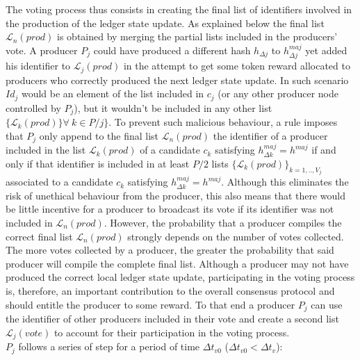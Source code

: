 The voting process thus consists in creating the final list of identifiers involved in the production of the ledger state update. As explained below the final list $\mathcal{L}_n(prod)$ is obtained by merging the partial lists included in the producers' vote. A producer $P_j$ could have produced a different hash $h_{\Delta j}$ to $h^{maj}_{\Delta j}$ yet added his identifier to $\mathcal{L}_j(prod)$ in the attempt to get some token reward allocated to producers who correctly produced the next ledger state update. In such scenario $Id_j$ would be an element of the list included in $c_j$ (or any other producer node controlled by $P_j$), but it wouldn't be included in any other list $\{\mathcal{L}_k(prod)\} \forall~k \in P/j\}$. To prevent such malicious behaviour, a rule imposes that $P_j$ only append to the final list $\mathcal{L}_n(prod)$ the identifier of a producer included in the list $\mathcal{L}_k(prod)$ of a candidate $c_k$ satisfying $h^{maj}_{\Delta k} = h^{maj}$ if and only if that identifier is included in at least $P/2$ lists $\{\mathcal{L}_{k}(prod)\}_{k=1,..,V_j}$ associated to a candidate $c_{k}$ satisfying $h^{maj}_{\Delta k} = h^{maj}$. Although this eliminates the risk of unethical behaviour from the producer, this also means that there would be little incentive for a producer to broadcast its vote if its identifier was not included in $\mathcal{L}_n(prod)$. However, the probability that a producer compiles the correct final list $\mathcal{L}_n(prod)$ strongly depends on the number of votes collected. The more votes collected by a producer, the greater the probability that said producer will compile the complete final list. Although a producer may not have produced the correct local ledger state update, participating in the voting process is, therefore, an important contribution to the overall consensus protocol and should entitle the producer to some reward. To that end a producer $P_j$ can use the identifier of other producers included in their vote and create a second list $\mathcal{L}_j(vote)$ to account for their participation in the voting process. \\
 
$P_j$ follows a series of step for a period of time $\Delta t_{v0}$ ($\Delta t_{v0} < \Delta t_{v}$):

